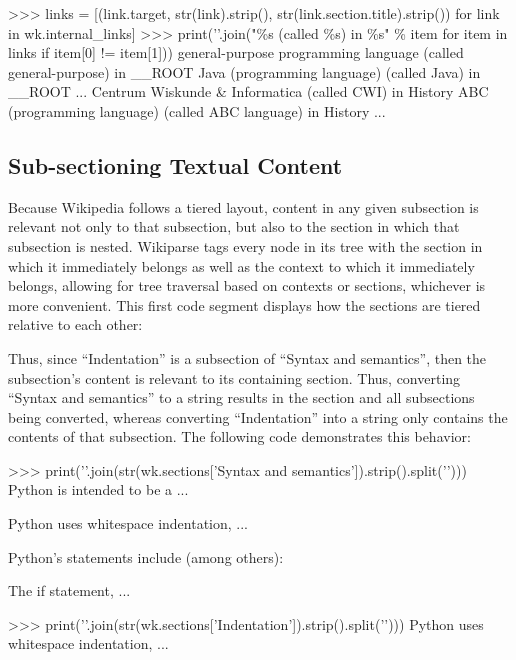 \begin{code}
>>> links = [(link.target, str(link).strip(), str(link.section.title).strip()) for link in wk.internal_links]
>>> print('\n'.join("\%s (called \%s) in \%s" \% item for item in links if item[0] != item[1]))
general-purpose programming language (called general-purpose) in __ROOT
Java (programming language) (called Java) in __ROOT
...
Centrum Wiskunde & Informatica (called CWI) in History
ABC (programming language) (called ABC language) in History
...
\end{code}


\subsection{Sub-sectioning Textual Content}

Because Wikipedia follows a tiered layout, content in any given subsection is relevant not only to that subsection, but also to the section in which that subsection is nested. Wikiparse tags every node in its tree with the section in which it immediately belongs as well as the context to which it immediately belongs, allowing for tree traversal based on contexts or sections, whichever is more convenient. This first code segment displays how the sections are tiered relative to each other:

\begin{code}
>>> import pprint
>>> pprint.pprint(wk.section_tree)
{'__ROOT': (...,
    {'History': (...,
                 OrderedDict()),
     'Features and philosophy': (...,
                                 OrderedDict()),
     'Syntax and semantics': (...,
        {'Indentation': (...,
                       OrderedDict()),
        'Statements and control flow': (...,
                                       OrderedDict()),
        ...
\end{code}

Thus, since ``Indentation'' is a subsection of ``Syntax and semantics'', then the subsection's content is relevant to its containing section. Thus, converting ``Syntax and semantics'' to a string results in the section and all subsections being converted, whereas converting ``Indentation'' into a string only contains the contents of that subsection. The following code demonstrates this behavior:

\begin{code}
>>> print('\n'.join(str(wk.sections['Syntax and semantics']).strip().split('\n')))
Python is intended to be a ...

Python uses whitespace indentation, ...

Python's statements include (among others):

 The if statement, ...
 
>>> print('\n'.join(str(wk.sections['Indentation']).strip().split('\n')))
Python uses whitespace indentation, ...
\end{code}

